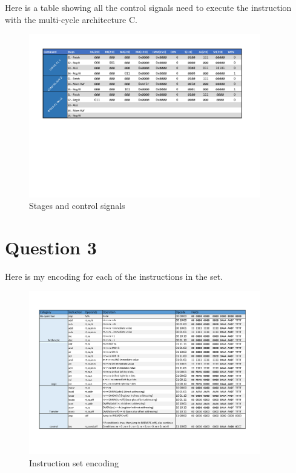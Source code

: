 \documentclass[11pt]{article}
\begin{document}
        Here is a table showing all the control signals need to execute the instruction with the multi-cycle architecture C.
    
        \begin{figure}[ht]
          \centering
          \includegraphics[width=0.9\textwidth]{tables/ControlSignals.pdf}
          \caption{Stages and control signals}
        \end{figure}
        
        
	\section{Question 3}
    
    Here is my encoding for each of the instructions in the set.
    
    \begin{figure}[ht]
      \centering
      \includegraphics[width=0.9\textwidth]{tables/Instructions_Table.pdf}
      \caption{Instruction set encoding}
    \end{figure}
\end{document}
